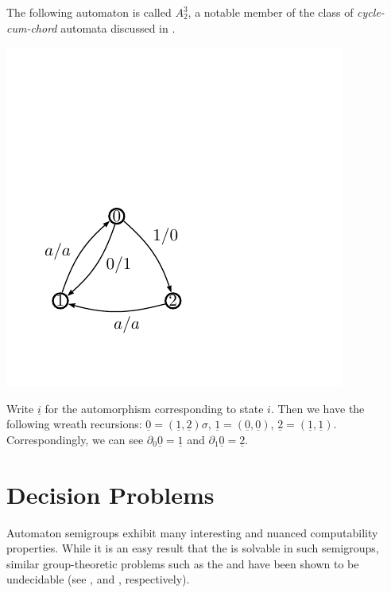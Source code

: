 \documentclass[11pt, titlepage]{article}
\begin{document}
\begin{example}
  The following automaton is called $A^3_2$, a notable member of the
  class of \emph{cycle-cum-chord} automata discussed in
  \cite{sutner:iterating}.
  \begin{center}
  \includegraphics[scale=0.4]{figures/a32-extended}
  \end{center}
  Write $\underline{i}$ for the automorphism corresponding to state
  $i$. Then we have the following wreath recursions:
  $\underline{0} = (\underline{1}, \underline{2})\sigma$,
  $\underline{1} = (\underline{0}, \underline{0})$,
  $\underline{2} = (\underline{1}, \underline{1})$. Correspondingly,
  we can see $\partial_0 \underline{0} = \underline{1}$ and
  $\partial_1 \underline{0} = \underline{2}$.
\end{example}

\section{Decision Problems}

Automaton semigroups exhibit many interesting and nuanced
computability properties. While it is an easy result that the
 is solvable in such semigroups, similar
group-theoretic problems such as the  and
 have been shown to be undecidable
(see \cite{sunic:conj}, and \cite{gillibert:finite}, respectively).
\end{document}
